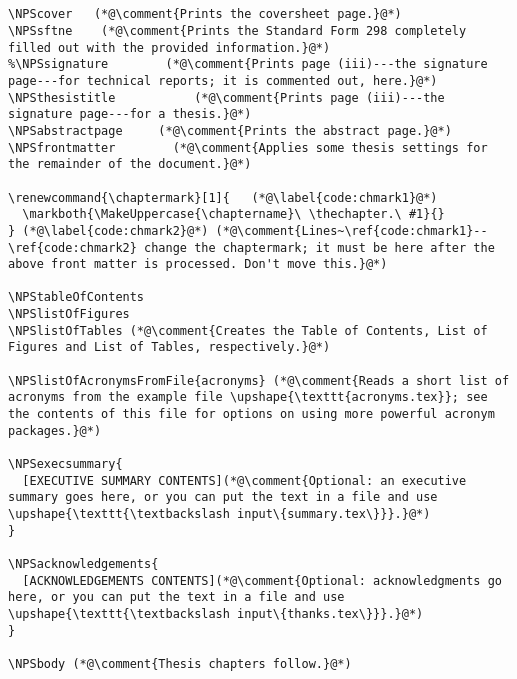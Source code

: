 \begin{lstlisting}


\NPScover   (*@\comment{Prints the coversheet page.}@*)
\NPSsftne    (*@\comment{Prints the Standard Form 298 completely filled out with the provided information.}@*)
%\NPSsignature        (*@\comment{Prints page (iii)---the signature page---for technical reports; it is commented out, here.}@*)
\NPSthesistitle           (*@\comment{Prints page (iii)---the signature page---for a thesis.}@*)
\NPSabstractpage     (*@\comment{Prints the abstract page.}@*)
\NPSfrontmatter        (*@\comment{Applies some thesis settings for the remainder of the document.}@*)

\renewcommand{\chaptermark}[1]{   (*@\label{code:chmark1}@*)
  \markboth{\MakeUppercase{\chaptername}\ \thechapter.\ #1}{}
} (*@\label{code:chmark2}@*) (*@\comment{Lines~\ref{code:chmark1}--\ref{code:chmark2} change the chaptermark; it must be here after the above front matter is processed. Don't move this.}@*)

\NPStableOfContents
\NPSlistOfFigures
\NPSlistOfTables (*@\comment{Creates the Table of Contents, List of Figures and List of Tables, respectively.}@*)

\NPSlistOfAcronymsFromFile{acronyms} (*@\comment{Reads a short list of acronyms from the example file \upshape{\texttt{acronyms.tex}}; see the contents of this file for options on using more powerful acronym packages.}@*)

\NPSexecsummary{
  [EXECUTIVE SUMMARY CONTENTS](*@\comment{Optional: an executive summary goes here, or you can put the text in a file and use \upshape{\texttt{\textbackslash input\{summary.tex\}}}.}@*)
}

\NPSacknowledgements{
  [ACKNOWLEDGEMENTS CONTENTS](*@\comment{Optional: acknowledgments go here, or you can put the text in a file and use \upshape{\texttt{\textbackslash input\{thanks.tex\}}}.}@*)
}

\NPSbody (*@\comment{Thesis chapters follow.}@*)
\end{lstlisting}


